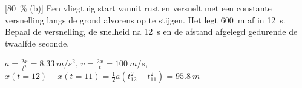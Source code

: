 
\begin{exercise}


[\SI{80}{\percent} (b)] Een vliegtuig start vanuit rust en versnelt met een constante versnelling langs de grond alvorens op te stijgen. Het legt \SI{600}{m} af in \SI{12}{s}. Bepaal de versnelling, de snelheid na \SI{12}{s} en de afstand afgelegd gedurende de twaalfde seconde.

\begin{oplossing}
	$a=\frac{2x}{t^2}=\SI{8,33}{m/s^2}$,
	$v=\frac{2x}{t}=\SI{100}{m/s}$,
	$x(t=12)-x(t=11)=\frac{1}{2}a(t_{12}^2-t_{11}^2)=\SI{95,8}{m}$
\end{oplossing}


\end{exercise}
